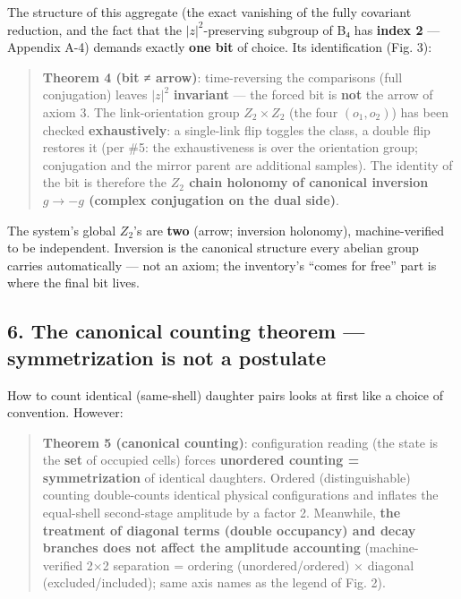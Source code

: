 \documentclass[
]{ltjsarticle}
\begin{document}
The structure of this aggregate (the exact vanishing of the fully
covariant reduction, and the fact that the \(|z|^2\)-preserving subgroup
of B₄ has \textbf{index 2} --- Appendix A-4) demands exactly \textbf{one
bit} of choice. Its identification (Fig. 3):

\begin{quote}
\textbf{Theorem 4 (bit ≠ arrow)}: time-reversing the comparisons (full
conjugation) leaves \(|z|^2\) \textbf{invariant} --- the forced bit is
\textbf{not} the arrow of axiom 3. The link-orientation group
\(Z_2\times Z_2\) (the four \((o_1,o_2)\)) has been checked
\textbf{exhaustively}: a single-link flip toggles the class, a double
flip restores it (per \#5: the exhaustiveness is over the orientation
group; conjugation and the mirror parent are additional samples). The
identity of the bit is therefore the \textbf{\(Z_2\) chain holonomy of
canonical inversion \(g\to-g\) (complex conjugation on the dual side)}.
\end{quote}

The system's global \(Z_2\)'s are \textbf{two} (arrow; inversion
holonomy), machine-verified to be independent. Inversion is the
canonical structure every abelian group carries automatically --- not an
axiom; the inventory's ``comes for free'' part is where the final bit
lives.

\subsection{6. The canonical counting theorem --- symmetrization is not
a
postulate}\label{the-canonical-counting-theorem-symmetrization-is-not-a-postulate}

How to count identical (same-shell) daughter pairs looks at first like a
choice of convention. However:

\begin{quote}
\textbf{Theorem 5 (canonical counting)}: configuration reading (the
state is the \textbf{set} of occupied cells) forces \textbf{unordered
counting = symmetrization} of identical daughters. Ordered
(distinguishable) counting double-counts identical physical
configurations and inflates the equal-shell second-stage amplitude by a
factor 2. Meanwhile, \textbf{the treatment of diagonal terms (double
occupancy) and decay branches does not affect the amplitude accounting}
(machine-verified 2×2 separation = ordering (unordered/ordered) ×
diagonal (excluded/included); same axis names as the legend of Fig. 2).
\end{quote}
\end{document}
